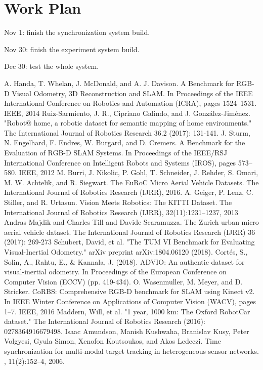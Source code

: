\documentclass[conference]{IEEEtran}
\begin{document}
\section{Work Plan}
	Nov 1: finish the synchronization system build.
	\par
	Nov 30: finish the experiment system build.
	\par
	Dec 30: test the whole system.

\begin{thebibliography}{00}
 A. Handa, T. Whelan, J. McDonald, and A. J. Davison. A Benchmark for RGB-D Visual Odometry, 3D Reconstruction and SLAM. In Proceedings of the IEEE International Conference on Robotics and Automation (ICRA), pages 1524–1531. IEEE, 2014
 Ruiz-Sarmiento, J. R., Cipriano Galindo, and J. González-Jiménez. "Robot@ home, a robotic dataset for semantic mapping of home environments." The International Journal of Robotics Research 36.2 (2017): 131-141.
 J. Sturm, N. Engelhard, F. Endres, W. Burgard, and D. Cremers. A Benchmark for the Evaluation of RGB-D SLAM Systems. In Proceedings of the IEEE/RSJ International Conference on Intelligent Robots and Systems (IROS), pages 573–580. IEEE, 2012
 M. Burri, J. Nikolic, P. Gohl, T. Schneider, J. Rehder, S. Omari, M. W. Achtelik, and R. Siegwart. The EuRoC Micro Aerial Vehicle Datasets. The International Journal of Robotics Research (IJRR), 2016.
 A. Geiger, P. Lenz, C. Stiller, and R. Urtasun. Vision Meets Robotics: The KITTI Dataset. The International Journal of Robotics Research (IJRR), 32(11):1231–1237, 2013
 Andras Majdik and Charles Till and Davide Scaramuzza. The Zurich urban micro aerial vehicle dataset. The International Journal of Robotics Research (IJRR) 36 (2017): 269-273
 Schubert, David, et al. "The TUM VI Benchmark for Evaluating Visual-Inertial Odometry." arXiv preprint arXiv:1804.06120 (2018).
 Cortés, S., Solin, A., Rahtu, E., \& Kannala, J. (2018). ADVIO: An authentic dataset for visual-inertial odometry. In Proceedings of the European Conference on Computer Vision (ECCV) (pp. 419-434).
 O. Wasenmuller, M. Meyer, and D. Stricker. CoRBS: Comprehensive RGB-D benchmark for SLAM using Kinect v2. In IEEE Winter Conference on Applications of Computer Vision (WACV), pages 1–7. IEEE, 2016
 Maddern, Will, et al. "1 year, 1000 km: The Oxford RobotCar dataset." The International Journal of Robotics Research (2016): 0278364916679498. 
Isaac Amundson, Manish Kushwaha, Branislav Kusy, Peter Volgyesi, Gyula Simon,
  Xenofon Koutsoukos, and Akos Ledeczi.
\newblock Time synchronization for multi-modal target tracking in heterogeneous
  sensor networks.
, 11(2):152--4, 2006.


\end{thebibliography}
\end{document}
